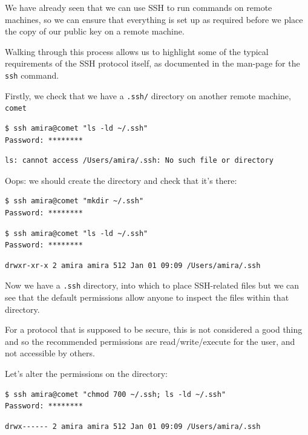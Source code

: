 \documentclass[
]{krantz}
\begin{document}
We have already seen that we can use SSH to run commands on remote
machines, so we can ensure that everything is set up as required before
we place the copy of our public key on a remote machine.

Walking through this process allows us to highlight some of the typical
requirements of the SSH protocol itself, as documented in the man-page
for the \texttt{ssh} command.

Firstly, we check that we have a \texttt{.ssh/} directory on another remote
machine, \texttt{comet}

\begin{verbatim}
$ ssh amira@comet "ls -ld ~/.ssh"
Password: ********
\end{verbatim}

\begin{verbatim}
ls: cannot access /Users/amira/.ssh: No such file or directory
\end{verbatim}

Oops:
we should create the directory and check that it's there:

\begin{verbatim}
$ ssh amira@comet "mkdir ~/.ssh"
Password: ********
\end{verbatim}

\begin{verbatim}
$ ssh amira@comet "ls -ld ~/.ssh"
Password: ********
\end{verbatim}

\begin{verbatim}
drwxr-xr-x 2 amira amira 512 Jan 01 09:09 /Users/amira/.ssh
\end{verbatim}

Now we have a \texttt{.ssh} directory, into which to place SSH-related
files but we can see that the default permissions allow anyone to
inspect the files within that directory.

For a protocol that is supposed to be secure, this is not considered
a good thing and so the recommended permissions are read/write/execute
for the user, and not accessible by others.

Let's alter the permissions on the directory:

\begin{verbatim}
$ ssh amira@comet "chmod 700 ~/.ssh; ls -ld ~/.ssh"
Password: ********
\end{verbatim}

\begin{verbatim}
drwx------ 2 amira amira 512 Jan 01 09:09 /Users/amira/.ssh
\end{verbatim}
\end{document}
